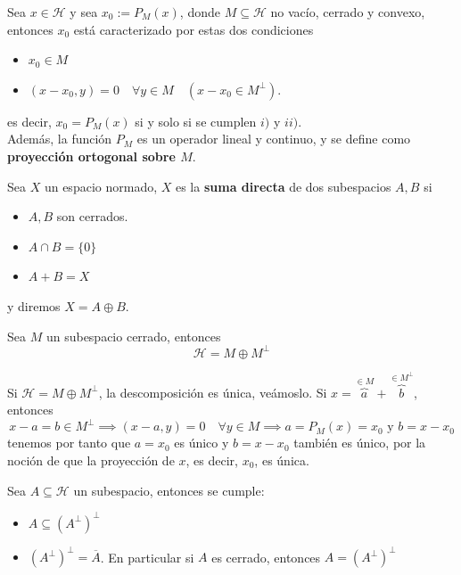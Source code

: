 \documentclass[12pt]{book}
\begin{document}
\begin{prop}
    Sea $x \in \mathcal{H}$ y sea $x_0 := P_{M}(x)$, donde $M\subseteq\mathcal{H}$ no vacío, cerrado y convexo, entonces $x_0$ está caracterizado por estas dos condiciones
    \begin{itemize}
        \item[i)] $x_0 \in M$
        \item[ii)] $(x - x_0, y) = 0 \quad \forall y \in M \quad (x - x_0 \in M^\perp)$.
    \end{itemize}
    es decir, $x_0=P_M(x)$ si y solo si se cumplen $i)$ y $ii)$. \\
    \noindent
    Además, la función $P_M$
    es un operador lineal y continuo, y se define como \textbf{proyección ortogonal sobre $M$}. \\
\end{prop}

\begin{definicion}
    Sea $X$ un espacio normado, $X$ es la \textbf{suma directa} de dos subespacios $A, B$ si
    \begin{itemize}
        \item $A, B$ son cerrados.
        \item $A \cap B = \{0\}$
        \item $A + B = X$
    \end{itemize}
    y diremos $X = A \oplus B$.
\end{definicion}

\begin{teo}
    Sea $M$ un subespacio cerrado, entonces 
    $$\mathcal{H} = M \oplus M^\perp$$
\end{teo}


\begin{observacion}
    Si $\mathcal{H} = M \oplus M^\perp$, la descomposición es única, veámoslo. Si $x = \overbrace{a}^{\in M} + \overbrace{b}^{\in M^\perp}$, entonces 
    $$x - a = b \in M^\perp \implies (x - a, y) = 0 \quad \forall y \in M \implies a = P_M(x) = x_0 \text{ y } b = x - x_0$$
    tenemos por tanto que $a=x_0$ es único y $b = x - x_0$ también es único, por la noción de que la proyección de $x$, es decir, $x_0$, es única.
\end{observacion}


\begin{observacion}
    Sea $A \subseteq \mathcal{H}$ un subespacio, entonces se cumple:
    \begin{itemize}
        \item[i)] $A \subseteq (A^\perp)^\perp$
        \item[ii)] $(A^\perp)^\perp = \overline{A}$. En particular si $A$ es cerrado, entonces $A = (A^\perp)^\perp$
    \end{itemize}
\end{observacion}
\end{document}

